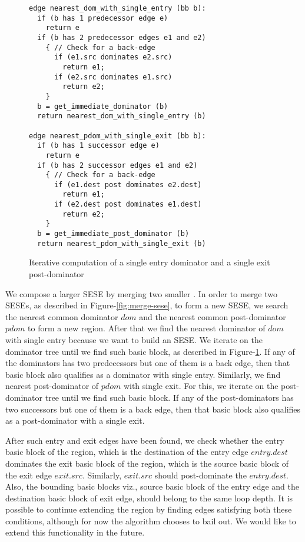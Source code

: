 \documentclass{sig-alternate}
\begin{document}
\begin{figure}
\begin{verbatim}
edge nearest_dom_with_single_entry (bb b):
  if (b has 1 predecessor edge e)
    return e
  if (b has 2 predecessor edges e1 and e2)
    { // Check for a back-edge
      if (e1.src dominates e2.src)
        return e1;
      if (e2.src dominates e1.src)
        return e2;
    }
  b = get_immediate_dominator (b)
  return nearest_dom_with_single_entry (b)

edge nearest_pdom_with_single_exit (bb b):
  if (b has 1 successor edge e)
    return e
  if (b has 2 successor edges e1 and e2)
    { // Check for a back-edge
      if (e1.dest post dominates e2.dest)
        return e1;
      if (e2.dest post dominates e1.dest)
        return e2;
    }
  b = get_immediate_post_dominator (b)
  return nearest_pdom_with_single_exit (b)
\end{verbatim}
\caption{Iterative computation of a single entry dominator and a single exit
  post-dominator}
\label{fig:iterate-single-entry}
\end{figure}

We compose a larger SESE by merging two smaller . In order to merge two
SESEs, as described in Figure-\ref{fig:merge-sese}, to form a new SESE, we
search the nearest common dominator $dom$ and the nearest common post-dominator
$pdom$ to form a new region.  After that we find the nearest dominator of $dom$
with single entry because we want to build an SESE.  We iterate on the dominator
tree until we find such basic block, as described in
Figure-\ref{fig:iterate-single-entry}.  If any of the dominators has two
predecessors but one of them is a back edge, then that basic block also
qualifies as a dominator with single entry.  Similarly, we find nearest
post-dominator of $pdom$ with single exit.  For this, we iterate on the
post-dominator tree until we find such basic block.  If any of the
post-dominators has two successors but one of them is a back edge, then that
basic block also qualifies as a post-dominator with a single exit.

After such entry and exit edges have been found, we check whether the entry
basic block of the region, which is the destination of the entry edge
$entry.dest$ dominates the exit basic block of the region, which is the source
basic block of the exit edge $exit.src$.  Similarly, $exit.src$ should
post-dominate the $entry.dest$.  Also, the bounding basic blocks viz., source
basic block of the entry edge and the destination basic block of exit edge,
should belong to the same loop depth.  It is possible to continue extending the
region by finding edges satisfying both these conditions, although for now the
algorithm chooses to bail out.  We would like to extend this functionality in the
future.
\end{document}
